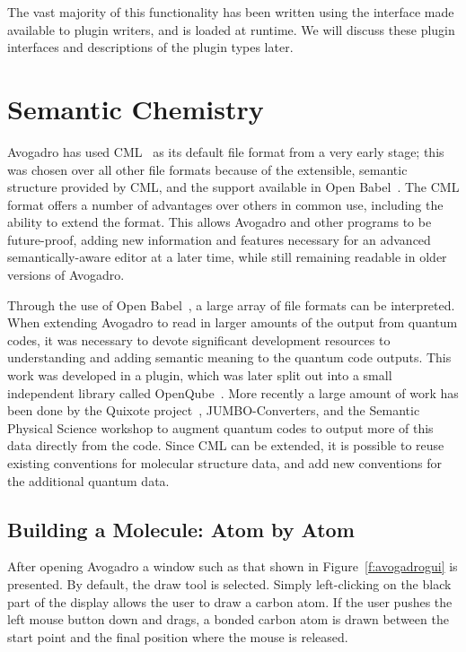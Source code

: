 \documentclass[10pt]{bmc_article}
\newenvironment{bmcformat}{\begin{raggedright}
\baselineskip20pt\sloppy\setboolean{publ}{false}}{\end{raggedright}
\baselineskip20pt\sloppy}
\begin{document}
\begin{bmcformat}
The vast majority of this functionality has been written using the
interface made available to plugin writers, and is loaded at
runtime. We will discuss these plugin interfaces and descriptions of
the plugin types later.

\section{Semantic Chemistry}

Avogadro has used CML~\cite{CML2011a, CML2011b} as its default file format from
a very early stage; this
was chosen over all other file formats because of the extensible,
semantic structure provided by CML, and the support available in Open Babel~\cite{OpenBabel}. The CML
format offers a number of advantages over others in common use, including the
ability to extend the format. This allows Avogadro and other programs
to be future-proof, adding new information and features
necessary for an advanced semantically-aware editor at a later time,
while still remaining readable in older versions of Avogadro.

Through the use of Open Babel~\cite{OpenBabel}, a large array of file
formats can be interpreted. When extending Avogadro to read in larger
amounts of the output from quantum codes, it was necessary to devote
significant development resources to understanding and adding semantic
meaning to the quantum code outputs. This work was developed in a plugin, which was later split out into a small independent
library called OpenQube~\cite{OpenQube,OpenQubeSource}. More recently a large amount of work has been done
by the Quixote project~\cite{Quixote}, JUMBO-Converters, and the Semantic
Physical Science workshop to augment quantum codes to output more of this data
directly from the code. Since CML can be extended, it is possible to reuse
existing conventions for molecular structure data, and add new
conventions for the additional quantum data.

\subsection{Building a Molecule: Atom by Atom}

After opening Avogadro a window such as that shown in Figure~\ref{f:avogadrogui}
is presented. By default, the draw tool is selected. Simply left-clicking on the
black part of the display
allows the user to draw a carbon atom. If the user pushes the left
mouse button down and drags, a bonded carbon atom is drawn
between the start point and the final position where the mouse is released.


\end{bmcformat}
\end{document}
